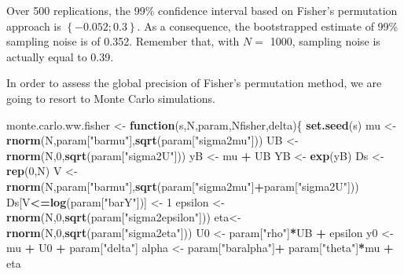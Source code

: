\documentclass[]{book}
\newenvironment{Shaded}{\begin{snugshade}}{\end{snugshade}}
\newcommand{\KeywordTok}[1]{\textcolor[rgb]{0.13,0.29,0.53}{\textbf{#1}}}
\newcommand{\DecValTok}[1]{\textcolor[rgb]{0.00,0.00,0.81}{#1}}
\newcommand{\StringTok}[1]{\textcolor[rgb]{0.31,0.60,0.02}{#1}}
\newcommand{\ControlFlowTok}[1]{\textcolor[rgb]{0.13,0.29,0.53}{\textbf{#1}}}
\newcommand{\OperatorTok}[1]{\textcolor[rgb]{0.81,0.36,0.00}{\textbf{#1}}}
\newcommand{\NormalTok}[1]{#1}
\theoremstyle{definition}
\theoremstyle{definition}
\theoremstyle{definition}
\theoremstyle{remark}
\begin{document}
Over 500 replications, the 99\% confidence interval based on Fisher's
permutation approach is \(\left\{-0.052;0.3\right\}\). As a consequence,
the bootstrapped estimate of 99\% sampling noise is of 0.352. Remember
that, with \(N=\) 1000, sampling noise is actually equal to 0.39.

In order to assess the global precision of Fisher's permutation method,
we are going to resort to Monte Carlo simulations.

\begin{Shaded}
\begin{Highlighting}[]
\NormalTok{monte.carlo.ww.fisher <-}\StringTok{ }\ControlFlowTok{function}\NormalTok{(s,N,param,Nfisher,delta)\{}
  \KeywordTok{set.seed}\NormalTok{(s)}
\NormalTok{  mu <-}\StringTok{ }\KeywordTok{rnorm}\NormalTok{(N,param[}\StringTok{"barmu"}\NormalTok{],}\KeywordTok{sqrt}\NormalTok{(param[}\StringTok{"sigma2mu"}\NormalTok{]))}
\NormalTok{  UB <-}\StringTok{ }\KeywordTok{rnorm}\NormalTok{(N,}\DecValTok{0}\NormalTok{,}\KeywordTok{sqrt}\NormalTok{(param[}\StringTok{"sigma2U"}\NormalTok{]))}
\NormalTok{  yB <-}\StringTok{ }\NormalTok{mu }\OperatorTok{+}\StringTok{ }\NormalTok{UB }
\NormalTok{  YB <-}\StringTok{ }\KeywordTok{exp}\NormalTok{(yB)}
\NormalTok{  Ds <-}\StringTok{ }\KeywordTok{rep}\NormalTok{(}\DecValTok{0}\NormalTok{,N)}
\NormalTok{  V <-}\StringTok{ }\KeywordTok{rnorm}\NormalTok{(N,param[}\StringTok{"barmu"}\NormalTok{],}\KeywordTok{sqrt}\NormalTok{(param[}\StringTok{"sigma2mu"}\NormalTok{]}\OperatorTok{+}\NormalTok{param[}\StringTok{"sigma2U"}\NormalTok{]))}
\NormalTok{  Ds[V}\OperatorTok{<=}\KeywordTok{log}\NormalTok{(param[}\StringTok{"barY"}\NormalTok{])] <-}\StringTok{ }\DecValTok{1} 
\NormalTok{  epsilon <-}\StringTok{ }\KeywordTok{rnorm}\NormalTok{(N,}\DecValTok{0}\NormalTok{,}\KeywordTok{sqrt}\NormalTok{(param[}\StringTok{"sigma2epsilon"}\NormalTok{]))}
\NormalTok{  eta<-}\StringTok{ }\KeywordTok{rnorm}\NormalTok{(N,}\DecValTok{0}\NormalTok{,}\KeywordTok{sqrt}\NormalTok{(param[}\StringTok{"sigma2eta"}\NormalTok{]))}
\NormalTok{  U0 <-}\StringTok{ }\NormalTok{param[}\StringTok{"rho"}\NormalTok{]}\OperatorTok{*}\NormalTok{UB }\OperatorTok{+}\StringTok{ }\NormalTok{epsilon}
\NormalTok{  y0 <-}\StringTok{ }\NormalTok{mu }\OperatorTok{+}\StringTok{  }\NormalTok{U0 }\OperatorTok{+}\StringTok{ }\NormalTok{param[}\StringTok{"delta"}\NormalTok{]}
\NormalTok{  alpha <-}\StringTok{ }\NormalTok{param[}\StringTok{"baralpha"}\NormalTok{]}\OperatorTok{+}\StringTok{  }\NormalTok{param[}\StringTok{"theta"}\NormalTok{]}\OperatorTok{*}\NormalTok{mu }\OperatorTok{+}\StringTok{ }\NormalTok{eta}

\end{Highlighting}
\end{Shaded}
\end{document}
